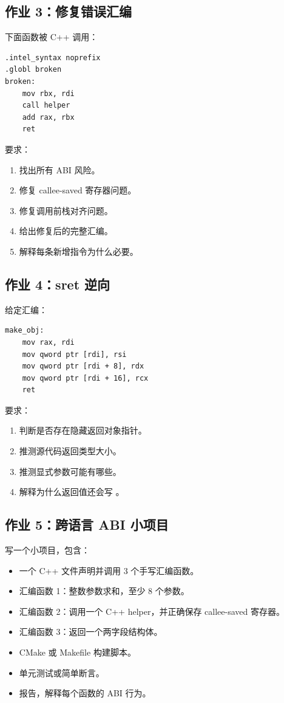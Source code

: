 \begin{exercisebox}
\subsection*{作业 3：修复错误汇编}

下面函数被 C++ 调用：

\begin{lstlisting}
.intel_syntax noprefix
.globl broken
broken:
    mov rbx, rdi
    call helper
    add rax, rbx
    ret
\end{lstlisting}

要求：

\begin{enumerate}
  \item 找出所有 ABI 风险。
  \item 修复 callee-saved 寄存器问题。
  \item 修复调用前栈对齐问题。
  \item 给出修复后的完整汇编。
  \item 解释每条新增指令为什么必要。
\end{enumerate}

\subsection*{作业 4：sret 逆向}

给定汇编：

\begin{lstlisting}
make_obj:
    mov rax, rdi
    mov qword ptr [rdi], rsi
    mov qword ptr [rdi + 8], rdx
    mov qword ptr [rdi + 16], rcx
    ret
\end{lstlisting}

要求：

\begin{enumerate}
  \item 判断是否存在隐藏返回对象指针。
  \item 推测源代码返回类型大小。
  \item 推测显式参数可能有哪些。
  \item 解释为什么返回值还会写 。
\end{enumerate}

\subsection*{作业 5：跨语言 ABI 小项目}

写一个小项目，包含：

\begin{itemize}
  \item 一个 C++ 文件声明并调用 3 个手写汇编函数。
  \item 汇编函数 1：整数参数求和，至少 8 个参数。
  \item 汇编函数 2：调用一个 C++ helper，并正确保存 callee-saved 寄存器。
  \item 汇编函数 3：返回一个两字段结构体。
  \item CMake 或 Makefile 构建脚本。
  \item 单元测试或简单断言。
  \item {} 报告，解释每个函数的 ABI 行为。
\end{itemize}


\end{exercisebox}
